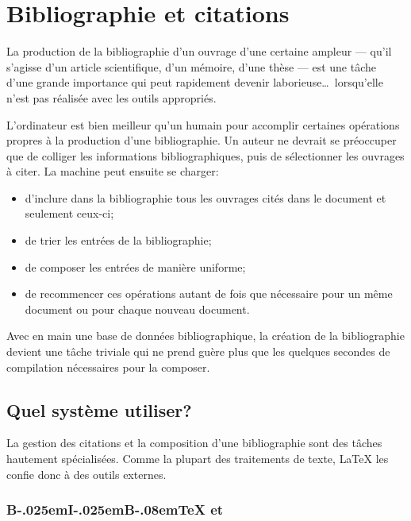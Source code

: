 \chapter{Bibliographie et citations}
\label{chap:bibliographie}

\nobibliography*

La production de la bibliographie d'un ouvrage d'une certaine ampleur
--- qu'il s'agisse d'un article scientifique, d'un mémoire, d'une
thèse --- est une tâche d'une grande importance qui peut rapidement devenir
laborieuse\dots\ lorsqu'elle n'est pas réalisée avec les outils appropriés.

L'ordinateur est bien meilleur qu'un humain pour accomplir certaines
opérations propres à la production d'une bibliographie. Un auteur ne
devrait se préoccuper que de colliger les informations
bibliographiques, puis de sélectionner les ouvrages à citer. La
machine peut ensuite se charger:
\begin{itemize}
\item d'inclure dans la bibliographie tous les ouvrages cités dans le
  document et seulement ceux-ci;
\item de trier les entrées de la bibliographie;
\item de composer les entrées de manière uniforme;
\item de recommencer ces opérations autant de fois que nécessaire pour
  un même document ou pour chaque nouveau document.
\end{itemize}

Avec en main une base de données bibliographique, la création de la
bibliographie devient une tâche triviale qui ne prend guère plus que
les quelques secondes de compilation nécessaires pour la composer.



\section{Quel système utiliser?}
\label{sec:bibliographie:systeme}

La gestion des citations et la composition d'une bibliographie sont
des tâches hautement spécialisées. Comme la plupart des traitements de
texte, {\LaTeX} les confie donc à des outils externes.

\subsection[{\BibTeX} et \pkg{natbib}]{%
  {B\kern-.025em{\small I}\kern-.025em{\small  B}\kern-.08em\TeX} %
  et }
\label{sec:bibliographie:systeme:bibtex}

